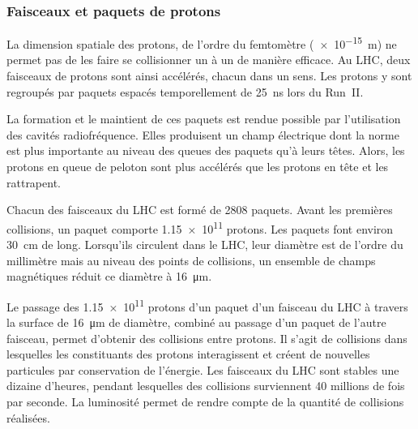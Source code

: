 \subsubsection{Faisceaux et paquets de protons}
La dimension spatiale des protons, de l'ordre du femtomètre (\SI{e-15}{\meter}) ne permet pas de les faire se collisionner un à un de manière efficace.
Au LHC, deux faisceaux de protons sont ainsi accélérés, chacun dans un sens.
Les protons y sont regroupés par paquets espacés temporellement de \SI{25}{\nano\second} lors du Run~II.
\par La formation et le maintient de ces paquets est rendue possible par l'utilisation des cavités radiofréquence.
Elles produisent un champ électrique dont la norme est plus importante au niveau des queues des paquets qu'à leurs têtes.
Alors, les protons \og en queue de peloton \fg{} sont plus accélérés que les protons en tête et les rattrapent.
\par
Chacun des faisceaux du LHC est formé de 2808 paquets.
Avant les premières collisions, un paquet comporte \num{1.15e11} protons.
Les paquets font environ \SI{30}{\centi\meter} de long.
Lorsqu'ils circulent dans le LHC, leur diamètre est de l'ordre du millimètre mais au niveau des points de collisions, un ensemble de champs magnétiques réduit ce diamètre à \SI{16}{\micro\meter}.
\par Le passage des \num{1.15e11} protons d'un paquet d'un faisceau du LHC à travers la surface de \SI{16}{\micro\meter} de diamètre, combiné au passage d'un paquet de l'autre faisceau, permet d'obtenir des collisions entre protons.
Il s'agit de collisions dans lesquelles les constituants des protons interagissent et créent de nouvelles particules par conservation de l'énergie.
Les faisceaux du LHC sont stables une dizaine d'heures, pendant lesquelles des collisions surviennent 40 millions de fois par seconde.
La luminosité permet de rendre compte de la quantité de collisions réalisées.
